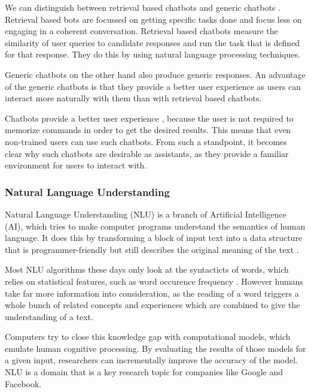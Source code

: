 
We can distinguish between retrieval based chatbots and generic chatbots \cite{NLKl19,WWX*16}.
Retrieval based bots are focussed on getting specific tasks done and focus less on engaging in a coherent conversation.
Retrieval based chatbots measure the similarity of user queries to candidate responses and run the task that is defined for that response.
They do this by using natural language processing techniques.

Generic chatbots on the other hand also produce generic responses.
An advantage of the generic chatbots is that they provide a better user experience as users can interact more naturally with them than with retrieval based chatbots.

Chatbots provide a better user experience \cite{CHW*17}, because the user is not required to memorize commands in order to get the desired results.
This means that even non-trained users can use such chatbots.
From such a standpoint, it becomes clear why such chatbots are desirable as assistants, as they provide a familiar environment for users to interact with.

\subsubsection{Natural Language Understanding}
Natural Language Understanding (NLU) is a branch of Artificial Intelligence (AI), which tries to make computer programs understand the semantics of human language.
It does this by transforming a block of input text into a data structure that is programmer-friendly but still describes the original meaning of the text \cite{CWB*11}.

Most NLU algorithms these days only look at the syntacticts of words, which relies on statistical features, such as word occurence frequency \cite{CaWh14}.
However humans take far more information into consideration, as the reading of a word triggers a whole bunch of related concepts and experiences which are combined to give the understanding of a text.

Computers try to close this knowledge gap with computational models, which emulate human cognitive processing.
By evaluating the results of those models for a given input, researchers can incrementally improve the accuracy of the model. \cite{CaWh14}
NLU is a domain that is a key research topic for companies like Google and Facebook. \cite{AAA17}


